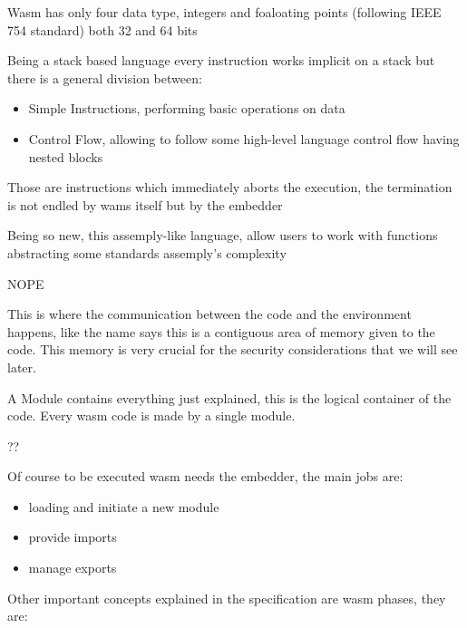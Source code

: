 \documentclass[../main.tex]{subfiles}
\begin{document}
\begin{description} [style=nextline]
  \item[Values]
        Wasm has only four data type, integers and foaloating points (following IEEE 754 standard) both 32 and 64 bits
  \item[Instructions]
        Being a stack based language every instruction works implicit on a stack but there is a general division between:
        \begin{itemize}
          \item Simple Instructions, performing basic operations on data
          \item Control Flow, allowing to follow some high-level language control flow having nested blocks
        \end{itemize}
  \item[Traps]
        Those are instructions which immediately aborts the execution, the termination is not endled by wams itself but by the embedder
  \item[Functions]
        Being so new, this assemply-like language, allow users to work with functions abstracting some standards assemply's complexity
  \item[Table] NOPE
  \item[Linear Memory]
        This is where the communication between the code and the environment happens, like the name says this is a contiguous area of memory given to the code. This memory is very crucial for the security considerations that we will see later.
  \item[Modules]
        A Module contains everything just explained, this is the logical container of the code. Every wasm code is made by a single module.
  \item[Imports] ??
  \item[Embedder]
        Of course to be executed wasm needs the embedder, the main jobs are:
        \begin{itemize}
          \item loading and initiate a new module
          \item provide imports
          \item manage exports
        \end{itemize}
\end{description}


Other important concepts explained in the specification are wasm phases, they are:
\end{document}
